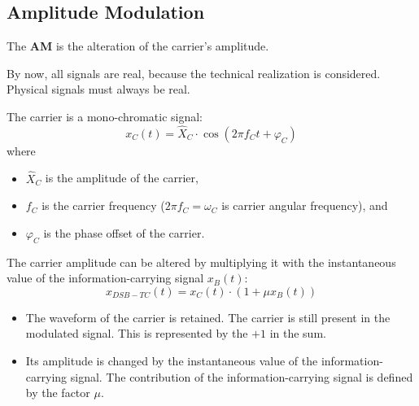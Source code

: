 \begin{refsection}
\label{sec:ch05:am}

\subsection{Amplitude Modulation}

The  \textbf{\acf{AM}} is the alteration of the carrier's amplitude.

\begin{attention}
	By now, all signals are real, because the technical realization is considered. Physical signals must always be real.
\end{attention}

The carrier is a mono-chromatic signal:
\begin{equation}
	x_C(t) = \hat{X}_C \cdot \cos\left(2\pi f_C t + \varphi_C\right)
\end{equation}
where
\begin{itemize}
	\item $\hat{X}_C$ is the amplitude of the carrier,
	\item $f_C$ is the carrier frequency ($2\pi f_C = \omega_C$ is carrier angular frequency), and
	\item $\varphi_C$ is the phase offset of the carrier.
\end{itemize}

The carrier amplitude can be altered by multiplying it with the instantaneous value of the information-carrying signal $x_B(t)$:
\begin{equation}
	x_{DSB-TC}(t) = x_C(t) \cdot \left(1 + \mu x_B(t)\right)
	\label{eq:ch05:amdsb_timedomain}
\end{equation}
\begin{itemize}
	\item The waveform of the carrier is retained. The carrier is still present in the modulated signal. This is represented by the $+1$ in the sum.
	\item Its amplitude is changed by the instantaneous value of the information-carrying signal. The contribution of the information-carrying signal is defined by the factor $\mu$.
\end{itemize}

\begin{figure}[H]
	\centering
	

\end{figure}
\end{refsection}
